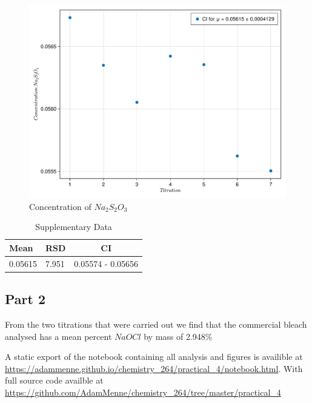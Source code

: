 \documentclass[a4paper, british]{article}
\begin{document}
\begin{figure}[h]
    \centering
    \includegraphics[width=\textwidth]{figures/titration.pdf}
    \caption{Concentration of \(Na_2S_2O_3\)}
    \label{fig:titration}
\end{figure}

\vspace{25mm}

\begin{table}[h]
    \centering
    \caption{Supplementary Data}
    \begin{tabular}{llc}
        \addlinespace
        \toprule
        Mean & RSD & CI\\ 
        \midrule
        0.05615 & 7.951 & 0.05574 - 0.05656\\
        \bottomrule
        \end{tabular}
        \label{table:data}   
\end{table}

\subsection{Part 2}

From the two titrations that were carried out we find that the commercial bleach analysed has a mean percent \(NaOCl\) by mass of 2.948\%

A static export of the notebook containing all analysis and figures is availible at \url{https://adammenne.github.io/chemistry_264/practical_4/notebook.html}. With full source code availble at \url{https://github.com/AdamMenne/chemistry_264/tree/master/practical_4}
\end{document}
